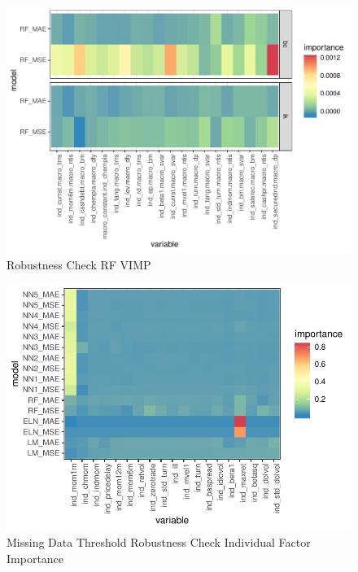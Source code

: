 \documentclass{article}
\begin{document}

\begin{figure}
	\includegraphics[]{../../Results/empirical/empirical_vimp.pdf}
	\caption{Robustness Check RF VIMP}
\end{figure}



\FloatBarrier


\begin{figure}
	\includegraphics[]{../../Results/empirical_missing_threshold/empirical_all_sample_vi_ind.pdf}
	\caption{Missing Data Threshold Robustness Check Individual Factor Importance}
\end{figure}
\end{document}
